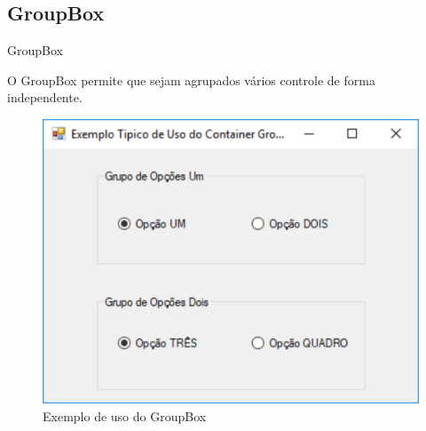 		\subsection{GroupBox}

		\begin{frame}
		
		
		\begin{CaixaModelo01}{GroupBox}
			
		O GroupBox permite que sejam agrupados vários controle de forma independente.	

			
		\begin{figure}
				\includegraphics[scale=.6]{./Figuras/F03_GroupBox}
				\caption{Exemplo de uso do GroupBox}
				\label{fig:GroupBox01}
			\end{figure}
			
			
		
	   \end{CaixaModelo01}
		

		



		
		
		
%		
%			
%
%	
%		

		\end{frame}